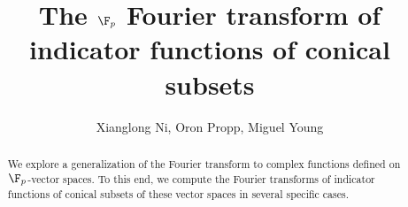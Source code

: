 \documentclass[10pt,a4paper]{amsart}
\begin{document}
	
	\title{The $\F_p$ Fourier transform of indicator functions of conical subsets}
	\author{Xianglong Ni, Oron Propp, Miguel Young }
	
	\maketitle

	\begin{abstract}
	    We explore a generalization of the Fourier transform to complex
	    functions defined on $\F_p$-vector spaces. To this end, we compute the Fourier
	    transforms of indicator functions of conical subsets of these vector spaces in several specific cases.
	\end{abstract}
	
	\tableofcontents

    
    
	
	
    
	\clearpage
	\appendix
	

    
	
\end{document}
